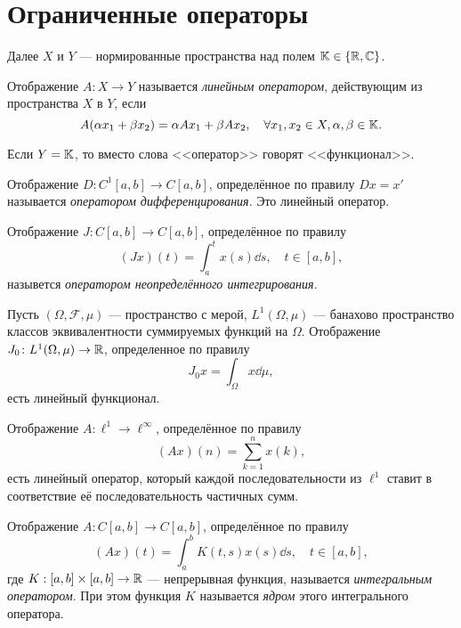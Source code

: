 \section{Ограниченные операторы}

Далее $X$ и $Y$ --- нормированные пространства над полем $\mathbb{K} \in \left\{\mathbb{R},
\mathbb{C}\right\}$.

\begin{definition}
    Отображение $A \colon X \to Y$ называется \emph{линейным оператором}, действующим
    из пространства $X$ в $Y$, если
    \[ A(\alpha x_1 + \beta x_2) = \alpha Ax_1 + \beta Ax_2, \quad \forall x_1,
    x_2 \in X, \alpha, \beta \in \mathbb{K}. \]
\end{definition}

Если $Y = \mathbb{K}$, то вместо слова <<оператор>> говорят <<функционал>>.

\begin{example}
    Отображение $D \colon C^1[a, b] \to C[a, b]$, определённое по правилу
    $Dx = x'$ называется \emph{оператором дифференцирования}. Это линейный
    оператор.
\end{example}

\begin{example}
    Отображение $J \colon C[a, b] \to C[a, b]$, определённое по правилу
    \[ (Jx)(t) = \int_{a}^t x(s) \dd s, \quad t \in [a, b], \]
    назывется \emph{оператором неопределённого интегрирования.}
\end{example}

\begin{example}
    Пусть $(\Omega, \mathcal F, \mu)$ --- пространство с мерой, $L^1(\Omega,
    \mu)$ --- банахово пространство классов эквивалентности суммируемых функций
    на $\Omega$. Отображение $J_0 \colon L^1(\Omega, \mu) \to \mathbb{R}$,
    определенное по правилу
    \[ J_0 x = \int_\Omega x \dd \mu, \]
    есть линейный функционал.
\end{example}

\begin{example}
    Отображение $A \colon \ell^1 \to \ell^\infty$, определённое по правилу
    \[ (Ax)(n) = \sum_{k=1}^n x(k), \]
    есть линейный оператор, который каждой последовательности из $\ell^1$ ставит
    в соответствие её последовательность частичных сумм.
\end{example}

\begin{example}
    Отображение $A \colon C[a, b] \to C[a, b]$, определённое по правилу
    \[ (Ax)(t) = \int_a^b K(t, s) x(s) \dd s, \quad t \in [a,b], \]
    где $K : [a, b] \times [a, b] \to \mathbb{R}$ --- непрерывная функция,
    называется \emph{интегральным оператором}. При этом функция $K$ называется
    \emph{ядром}
    этого интегрального оператора.
\end{example}

